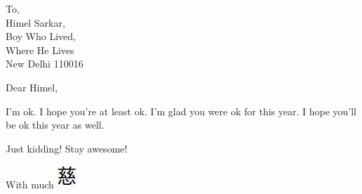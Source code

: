 \documentclass [a4paper]{letter}
\date{May 2, 2015}
\begin{document}
\begin {letter} {To, \\Himel Sarkar,\\Boy Who Lived, \\ Where He Lives\\New Delhi 110016}
\opening {Dear Himel,}
I'm ok. I hope you're at least ok.
I'm glad you were ok for this year. I hope you'll be ok this year as well.

\begin{center}Just kidding! Stay awesome!\end{center}
\closing{With much \hspace{0.5pt} \includegraphics[scale=0.7]{mt}}
\end {letter}
\end{document}
